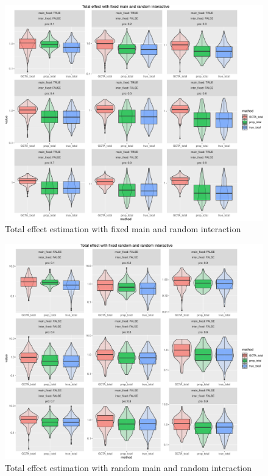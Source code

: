 \documentclass[]{article}
\begin{document}
\begin{figure}
\centering
\includegraphics{Simulation_report_files/figure-latex/Total effect fixed random 6-1.pdf}
\caption{Total effect estimation with fixed main and random interaction}
\end{figure}

\begin{figure}
\centering
\includegraphics{Simulation_report_files/figure-latex/Total effect random random 6-1.pdf}
\caption{Total effect estimation with random main and random
interaction}
\end{figure}
\end{document}
